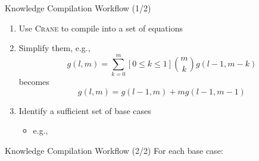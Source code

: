 \documentclass{beamer}
\begin{document}
\begin{frame}{Knowledge Compilation Workflow (1/2)}
  \begin{enumerate}
    \item Use \textsc{Crane} to compile \structure{$\phi$} into a set of
          equations 
    \item Simplify them, e.g.,
          \[
            g(l, m) = \sum_{k=0}^{m}[0 \le k \le 1]\binom{m}{k}g(l-1, m-k)
          \]
          becomes
          \[
            g(l, m) = g(l-1, m) + mg(l-1, m-1)
          \]
    \item Identify a sufficient set of base cases
          \begin{itemize}
            \item e.g., 
          \end{itemize}
  \end{enumerate}
\end{frame}

\begin{frame}[fragile]{Knowledge Compilation Workflow (2/2)}
  \centering For each base case:

\end{frame}
\end{document}
